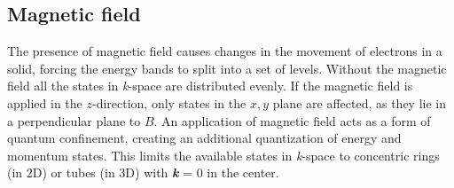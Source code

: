 \documentclass[titlepage,a4paper]{book}
\newcommand{\wciecie}{\quad\phantom{v}}
\begin{document}


\subsection{Magnetic field}
\label{section:DOS_at_magneticField}
\wciecie
The presence of magnetic field causes changes in the movement of electrons in a solid, forcing the energy bands to split into a set of levels. Without the magnetic field all the states in \textit{k}-space are distributed evenly. If the magnetic field is applied in the $z$-direction, only states in the $x,y$ plane are affected, as they lie in a perpendicular plane to $B$. An application of magnetic field acts as a form of quantum confinement, creating an additional quantization of energy and momentum states. This limits the available states in \textit{k}-space to concentric rings (in 2D) or tubes (in 3D) with \textbf{\textit{k}} = 0 in the center. 
\end{document}
